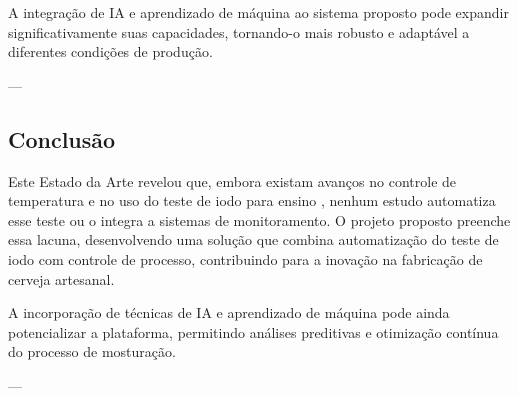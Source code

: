 A integração de IA e aprendizado de máquina ao sistema proposto pode expandir significativamente suas capacidades, tornando-o mais robusto e adaptável a diferentes condições de produção.

---

\subsection{Conclusão}
Este Estado da Arte revelou que, embora existam avanços no controle de temperatura \cite{parizotto2017} e no uso do teste de iodo para ensino \cite{almeida2024}, nenhum estudo automatiza esse teste ou o integra a sistemas de monitoramento. O projeto proposto preenche essa lacuna, desenvolvendo uma solução que combina automatização do teste de iodo com controle de processo, contribuindo para a inovação na fabricação de cerveja artesanal.

A incorporação de técnicas de IA e aprendizado de máquina \cite{zhang2025} pode ainda potencializar a plataforma, permitindo análises preditivas e otimização contínua do processo de mosturação.

---
